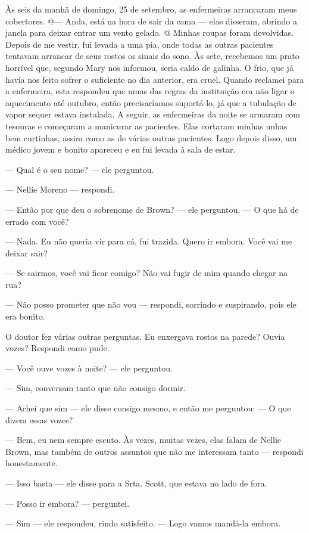 Às seis da manhã de domingo, 25 de setembro, as enfermeiras arrancaram
meus cobertores. @--- Anda, está na hora de sair da cama --- elas
disseram, abrindo a janela para deixar entrar um vento gelado. @ Minhas
roupas foram devolvidas. Depois de me vestir, fui levada a uma pia, onde
todas as outras pacientes tentavam arrancar de seus rostos os sinais do
sono. Às sete, recebemos um prato horrível que, segundo Mary nos
informou, seria caldo de galinha. O frio, que já havia nos feito sofrer
o suficiente no dia anterior, era cruel. Quando reclamei para a
enfermeira, esta respondeu que umas das regras da instituição era não
ligar o aquecimento até outubro, então precisaríamos suportá-lo, já que
a tubulação de vapor sequer estava instalada. A seguir, as enfermeiras
da noite se armaram com tesouras e começaram a manicurar as pacientes.
Elas cortaram minhas unhas bem curtinhas, assim como as de várias outras
pacientes. Logo depois disso, um médico jovem e bonito apareceu e eu fui
levada à sala de estar.

--- Qual é o seu nome? --- ele perguntou.

--- Nellie Moreno --- respondi.

--- Então por que deu o sobrenome de Brown? --- ele perguntou. --- O que
há de errado com você?

--- Nada. Eu não queria vir para cá, fui trazida. Quero ir embora. Você
vai me deixar sair?

--- Se sairmos, você vai ficar comigo? Não vai fugir de mim quando
chegar na rua?

--- Não posso prometer que não vou --- respondi, sorrindo e suspirando,
pois ele era bonito.

O doutor fez várias outras perguntas. Eu enxergava rostos na parede?
Ouvia vozes? Respondi como pude.

--- Você ouve vozes à noite? --- ele perguntou.

--- Sim, conversam tanto que não consigo dormir.

--- Achei que sim --- ele disse consigo mesmo, e então me perguntou: ---
O que dizem essas vozes?

--- Bem, eu nem sempre escuto. Às vezes, muitas vezes, elas falam de
Nellie Brown, mas também de outros assuntos que não me interessam tanto
--- respondi honestamente.

--- Isso basta --- ele disse para a Srta. Scott, que estava no lado de
fora.

--- Posso ir embora? --- perguntei.

--- Sim --- ele respondeu, rindo satisfeito. --- Logo vamos mandá-la
embora.


